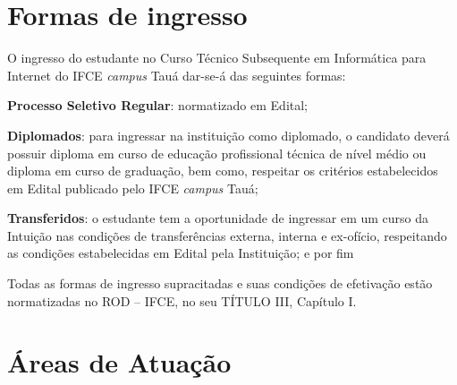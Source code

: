 \documentclass[
	12pt,				%
	openright,			%
	twoside,			%
	a4paper,			%
	chapter=TITLE,		%
	english,			%
	french,				%
	spanish,			%
	brazil,				%
	]{abntex2}
\begin{document}
\chapter{Formas de ingresso}


O ingresso do estudante no Curso Técnico Subsequente em Informática para Internet do IFCE \textit{campus} Tauá dar-se-á das seguintes formas:

\begin{alineas}
    \item \textbf{Processo Seletivo Regular}: normatizado em Edital;
    
    \item \textbf{Diplomados}: para ingressar na instituição como diplomado, o candidato deverá possuir diploma em curso de educação profissional técnica de nível médio ou diploma em curso de graduação, bem como, respeitar os critérios estabelecidos em Edital publicado pelo IFCE \textit{campus} Tauá;
    
    \item \textbf{Transferidos}: o estudante tem a oportunidade de ingressar em um curso da Intuição nas condições de transferências externa, interna e ex-ofício, respeitando as condições estabelecidas em Edital pela Instituição; e por fim
    
\end{alineas}

Todas as formas de ingresso supracitadas e suas condições de efetivação estão normatizadas no  ROD -- IFCE, no seu TÍTULO III, Capítulo I.


\chapter{Áreas de Atuação}
\end{document}
